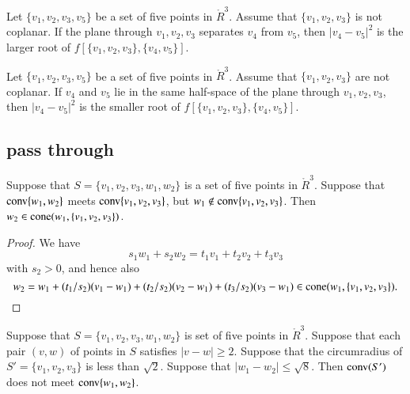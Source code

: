 \begin{lemma}
Let $\{v_1,v_2,v_3,v_5\}$ be a set of five
points in $\ring{R}^3$.  Assume that $\{v_1,v_2,v_3\}$ is not coplanar.
If the plane through $v_1,v_2,v_3$ separates
$v_4$ from $v_5$, then $|v_4-v_5|^2$ is the larger root of 
$f[\{v_1,v_2,v_3\},\{v_4,v_5\}]$.
\end{lemma}

\begin{lemma} 
Let $\{v_1,v_2,v_3,v_5\}$ be a set of five
points in $\ring{R}^3$.  Assume that $\{v_1,v_2,v_3\}$ are not
coplanar.
If $v_4$ and $v_5$ lie in the same half-space of the plane through $v_1,v_2,v_3$, then 
 $|v_4-v_5|^2$ is the smaller root of $f[\{v_1,v_2,v_3\},\{v_4,v_5\}]$.
\end{lemma}




\newpage

\subsection{pass through}

\begin{lemma}
Suppose that $S=\{v_1,v_2,v_3,w_1,w_2\}$
is a set of five points in  $\ring{R}^3$.  Suppose
that  ${\operatorname{conv}}\{w_1,w_2\}$ meets ${\operatorname{conv}}\{v_1,v_2,v_3\}$,
but $w_1\not\in{\operatorname{conv}}\{v_1,v_2,v_3\}$.
Then $w_2\in{\operatorname{cone}}(w_1,\{v_1,v_2,v_3\})$.
\end{lemma}

\begin{proof}
We have 
  $$
  s_1 w_1 + s_2 w_2 = t_1 v_1 + t_2 v_2 + t_3 v_3
  $$
with $s_2>0$,
and hence also
  $$
  w_2 = w_1 + (t_1/s_2) (v_1-w_1) + 
       (t_2/s_2) (v_2 - w_1) + (t_3/s_2) (v_3-w_1)\in 
   {\operatorname{cone}}(w_1,\{v_1,v_2,v_3\}).
  $$
\end{proof}


\newpage
\begin{lemma}
Suppose that  $S=\{v_1,v_2,v_3,w_1,w_2\}$
is set of five points in $\ring{R}^3$.  
Suppose that each pair $(v,w)$ of points
in $S$ satisfies $|v-w|\ge 2$.
Suppose that the circumradius of $S'=\{v_1,v_2,v_3\}$ is less than
$\sqrt2$.  Suppose that $|w_1-w_2|\le \sqrt8$.  Then
${\operatorname{conv}}(S')$ does not meet ${\operatorname{conv}}\{w_1,w_2\}$.
\end{lemma}

